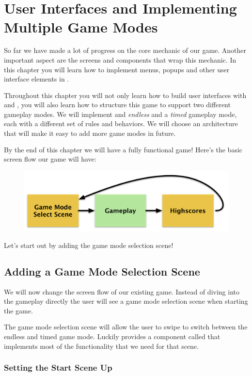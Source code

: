 \chapter{User Interfaces and Implementing Multiple Game Modes}

So far we have made a lot of progress on the core mechanic of our game. Another
important aspect are the screens and components that wrap this mechanic. In this chapter
you will learn how to implement menus, popups and other user interface elements
in \cocos{}. 

Throughout this chapter you will not only learn how to build user interfaces
with \cocos{} and \SB{}, you will also learn how to structure this game to
support two different gameplay modes. We will implement and \textit{endless} and
a \textit{timed} gameplay mode, each with a different set of rules and
behaviors. We will choose an architecture that will make it easy to add more
game modes in future.

By the end of this chapter we will have a fully functional game!
Here's the basic screen flow our game will have:

\begin{figure}[H]
		\centering
		\includegraphics[width=0.7\linewidth]{images/Chapter6/screen_flow.png}
\end{figure}

Let's start out by adding the game mode selection scene!

\section{Adding a Game Mode Selection Scene}
We will now change the screen flow of our existing game. Instead of diving into
the gameplay directly the user will see a game mode selection scene when
starting the game. 

The game mode selection scene will allow the user to swipe to switch between the
endless and timed game mode. Luckily \cocos{} provides a component called
 that implements
most of the functionality that we need for that scene.

\subsection{Setting the Start Scene Up}

